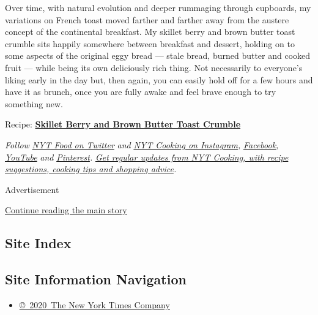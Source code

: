 Over time, with natural evolution and deeper rummaging through
cupboards, my variations on French toast moved farther and farther away
from the austere concept of the continental breakfast. My skillet berry
and brown butter toast crumble sits happily somewhere between breakfast
and dessert, holding on to some aspects of the original eggy bread ---
stale bread, burned butter and cooked fruit --- while being its own
deliciously rich thing. Not necessarily to everyone's liking early in
the day but, then again, you can easily hold off for a few hours and
have it as brunch, once you are fully awake and feel brave enough to try
something new.

Recipe:
\textbf{\href{https://cooking.nytimes3xbfgragh.onion/recipes/1021208-skillet-berry-and-brown-butter-toast-crumble}{Skillet
Berry and Brown Butter Toast Crumble}}

\emph{Follow} \href{https://twitter.com/nytfood}{\emph{NYT Food on
Twitter}} \emph{and}
\href{https://www.instagram.com/nytcooking/}{\emph{NYT Cooking on
Instagram}}\emph{,}
\href{https://www.facebookcorewwwi.onion/nytcooking/}{\emph{Facebook}}\emph{,}
\href{https://www.youtube.com/nytcooking}{\emph{YouTube}} \emph{and}
\href{https://www.pinterest.com/nytcooking/}{\emph{Pinterest}}\emph{.}
\href{https://www.nytimes3xbfgragh.onion/newsletters/cooking}{\emph{Get
regular updates from NYT Cooking, with recipe suggestions, cooking tips
and shopping advice}}\emph{.}

Advertisement

\protect\hyperlink{after-bottom}{Continue reading the main story}

\hypertarget{site-index}{%
\subsection{Site Index}\label{site-index}}

\hypertarget{site-information-navigation}{%
\subsection{Site Information
Navigation}\label{site-information-navigation}}

\begin{itemize}
\tightlist
\item
  \href{https://help.nytimes3xbfgragh.onion/hc/en-us/articles/115014792127-Copyright-notice}{©~2020~The
  New York Times Company}
\end{itemize}

